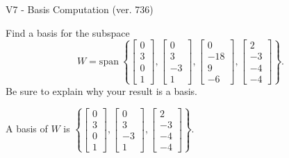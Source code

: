 \begin{exercise}
  \begin{exerciseTitle}V7 - Basis Computation (ver. 736)\end{exerciseTitle}
  \begin{exerciseStatement}
    Find a basis for the subspace 
\[W=\mathrm{span}\ \left\{\left[\begin{array}{r}
0 \\
3 \\
0 \\
1
\end{array}\right] , \left[\begin{array}{r}
0 \\
3 \\
-3 \\
1
\end{array}\right] , \left[\begin{array}{r}
0 \\
-18 \\
9 \\
-6
\end{array}\right] , \left[\begin{array}{r}
2 \\
-3 \\
-4 \\
-4
\end{array}\right]\right\}.\]
 Be sure to explain why your result is a basis.


  \end{exerciseStatement}
  \begin{exerciseAnswer}
   A basis of \(W\) is  \(\left\{\left[\begin{array}{r}
0 \\
3 \\
0 \\
1
\end{array}\right] , \left[\begin{array}{r}
0 \\
3 \\
-3 \\
1
\end{array}\right] , \left[\begin{array}{r}
2 \\
-3 \\
-4 \\
-4
\end{array}\right]\right\}\).
  


  \end{exerciseAnswer}
\end{exercise}